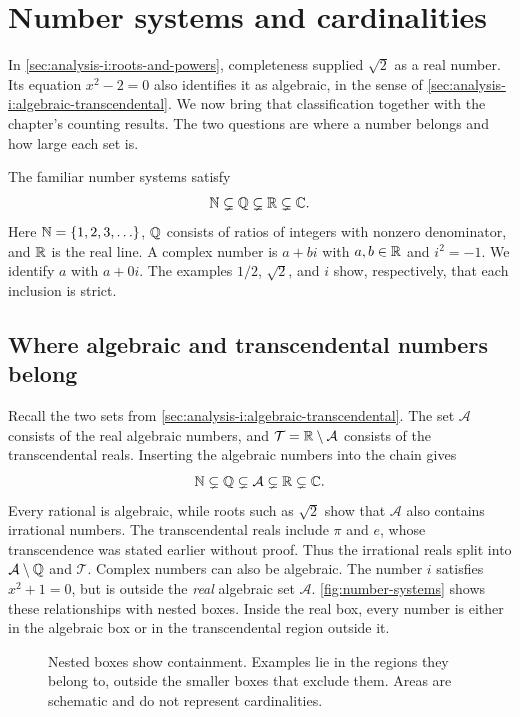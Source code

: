 
\section{Number systems and cardinalities}
\label{sec:analysis-i:number-systems}

In \autoref{sec:analysis-i:roots-and-powers}, completeness supplied
$\sqrt2$ as a real number. Its equation $x^2-2=0$ also identifies it
as algebraic, in the sense of
\autoref{sec:analysis-i:algebraic-transcendental}. We now bring that
classification together with the chapter's counting results. The two
questions are where a number belongs and how large each set is.

The familiar number systems satisfy
\[
  \mathbb{N}\subsetneq\mathbb{Q}\subsetneq\mathbb{R}\subsetneq\mathbb{C}.
\]
Here $\mathbb{N}=\{1,2,3,\ldots\}$, $\mathbb{Q}$ consists of ratios of integers with
nonzero denominator, and $\mathbb{R}$ is the real line. A complex number is
$a+bi$ with $a,b\in\mathbb{R}$ and $i^2=-1$. We identify $a$ with $a+0i$.
The examples $1/2$, $\sqrt2$, and $i$ show, respectively, that each
inclusion is strict.

\subsection{Where algebraic and transcendental numbers belong}
Recall the two sets from
\autoref{sec:analysis-i:algebraic-transcendental}. The set
$\mathcal A$ consists of the real algebraic numbers, and
$\mathcal T=\mathbb{R}\setminus\mathcal A$ consists of the transcendental reals.
Inserting the algebraic numbers into the chain gives
\[
  \mathbb{N}\subsetneq\mathbb{Q}\subsetneq\mathcal A\subsetneq\mathbb{R}\subsetneq\mathbb{C}.
\]
Every rational is algebraic, while roots such as $\sqrt2$ show that
$\mathcal A$ also contains irrational numbers. The transcendental
reals include $\pi$ and $e$, whose transcendence was stated earlier
without proof. Thus the irrational reals split into
$\mathcal A\setminus\mathbb{Q}$ and $\mathcal T$.
Complex numbers can also be algebraic. The number $i$ satisfies $x^2+1=0$, but
is outside the \emph{real} algebraic set $\mathcal A$.
\autoref{fig:number-systems} shows these relationships with nested boxes.
Inside the real box, every number is either in the algebraic box or in
the transcendental region outside it.

\begin{figure}[htbp]
  \centering
  
  \caption[Containment of the number systems.]{Nested boxes show
    containment. Examples lie in the regions they belong to, outside
    the smaller boxes that exclude them. Areas are schematic and do
    not represent cardinalities.}
  \label{fig:number-systems}
\end{figure}

